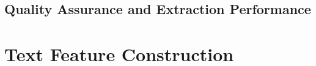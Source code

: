 \documentclass[12pt,a4paper,oneside]{report}
\begin{document}
\section{Quality Assurance and Extraction Performance}
\label{sec:extraction_quality}


\chapter{Text Feature Construction}
\label{ch:text_features}
\end{document}
